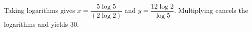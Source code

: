 Taking logarithms gives $x=\dfrac{5\log5}{(2\log2)}$ and $y=\dfrac{12\log2}{\log5}$. Multiplying cancels the logarithms and yields $\boxed{30}$.
